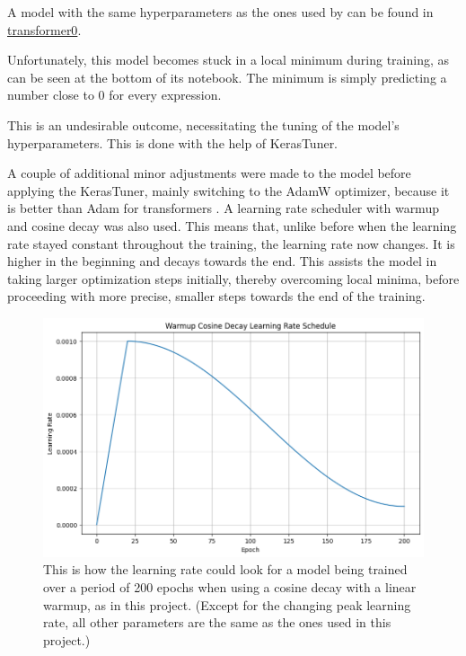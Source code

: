\documentclass{article}
\begin{document}
A model with the same hyperparameters as the ones used by \cite{vaswani2023attentionneed} can be found in \href{https://github.com/AntonStantan/matura/blob/main/transformer/transformer0.ipynb}{transformer0}.

Unfortunately, this model becomes stuck in a local minimum during training, as can be seen at the bottom of its notebook. The minimum is simply predicting a number close to 0 for every expression.

This is an undesirable outcome, necessitating the tuning of the model's hyperparameters. This is done with the help of KerasTuner.

A couple of additional minor adjustments were made to the model before applying the KerasTuner, mainly switching to the AdamW optimizer, because it is better than Adam for transformers \cite{loshchilov2019decoupledweightdecayregularization}. A learning rate scheduler with warmup and cosine decay was also used. This means that, unlike before when the learning rate stayed constant throughout the training, the learning rate now changes. It is higher in the beginning and decays towards the end. This assists the model in taking larger optimization steps initially, thereby overcoming local minima, before proceeding with more precise, smaller steps towards the end of the training.

\begin{figure}[htbp]
    \centering
    \includegraphics[width=0.5\paperwidth]{images/learningRate.png}
    \caption{This is how the learning rate could look for a model being trained over a period of 200 epochs when using a cosine decay with a linear warmup, as in this project. (Except for the changing peak learning rate, all other parameters are the same as the ones used in this project.)}
    \label{fig:learningrate}
\end{figure}
\end{document}
